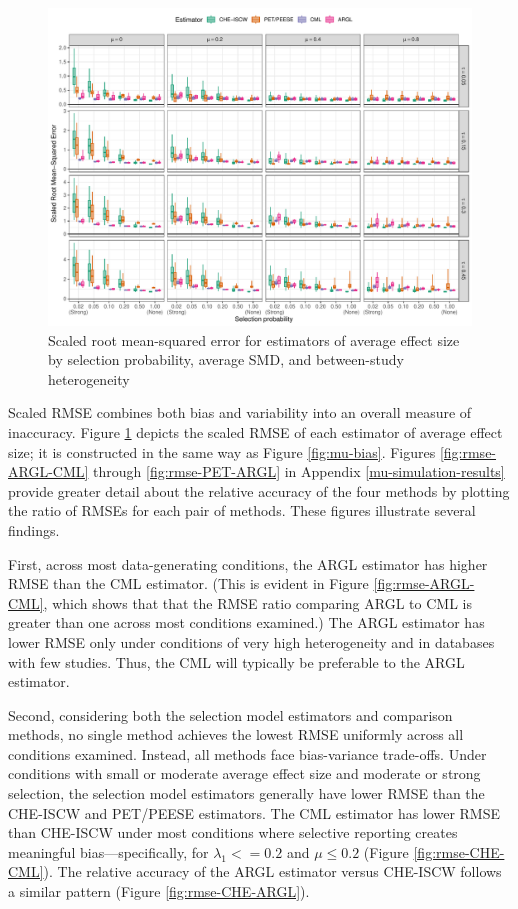 \documentclass[
  man, donotrepeattitle,floatsintext]{apa7}
\begin{document}
\begin{figure}
\includegraphics{selection_models_draft_files/figure-latex/mu-rmse-1} \caption{Scaled root mean-squared error for estimators of average effect size by selection probability, average SMD, and between-study heterogeneity}\label{fig:mu-rmse}
\end{figure}

Scaled RMSE combines both bias and variability into an overall measure of inaccuracy.
Figure \ref{fig:mu-rmse} depicts the scaled RMSE of each estimator of average effect size; it is constructed in the same way as Figure \ref{fig:mu-bias}.
Figures \ref{fig:rmse-ARGL-CML} through \ref{fig:rmse-PET-ARGL} in Appendix \ref{mu-simulation-results} provide greater detail about the relative accuracy of the four methods by plotting the ratio of RMSEs for each pair of methods.
These figures illustrate several findings.

First, across most data-generating conditions, the ARGL estimator has higher RMSE than the CML estimator. (This is evident in Figure \ref{fig:rmse-ARGL-CML}, which shows that that the RMSE ratio comparing ARGL to CML is greater than one across most conditions examined.)
The ARGL estimator has lower RMSE only under conditions of very high heterogeneity and in databases with few studies.
Thus, the CML will typically be preferable to the ARGL estimator.

Second, considering both the selection model estimators and comparison methods, no single method achieves the lowest RMSE uniformly across all conditions examined.
Instead, all methods face bias-variance trade-offs.
Under conditions with small or moderate average effect size and moderate or strong selection, the selection model estimators generally have lower RMSE than the CHE-ISCW and PET/PEESE estimators.
The CML estimator has lower RMSE than CHE-ISCW under most conditions where selective reporting creates meaningful bias---specifically, for \(\lambda_1 <= 0.2\) and \(\mu \leq 0.2\) (Figure \ref{fig:rmse-CHE-CML}).
The relative accuracy of the ARGL estimator versus CHE-ISCW follows a similar pattern (Figure \ref{fig:rmse-CHE-ARGL}).
\end{document}
